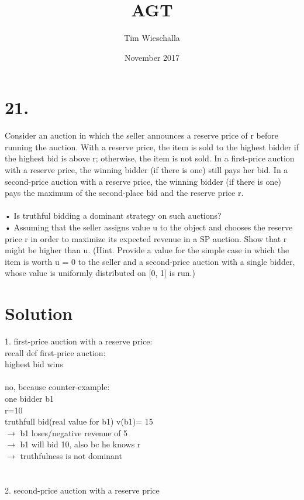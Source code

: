 \documentclass{article}
\title{AGT}
\author{Tim Wieschalla}
\date{November 2017}
\begin{document}
\maketitle

\section{21.}

 Consider an auction in which the seller announces a reserve price of r before running the auction. With a reserve price, the item is sold to the highest bidder if the highest bid is above r; otherwise, the item is not sold. In a first-price auction with a reserve price, the winning bidder (if there is one) still pays her bid. In a second-price auction with a reserve price, the winning bidder (if there is one) pays the maximum of the second-place bid and the reserve price r.
\\
\\
• Is truthful bidding a dominant strategy on such auctions?\\
• Assuming that the seller assigns value u to the object and chooses the reserve price r in order to maximize its expected revenue in a SP auction. Show that r might be higher than u. (Hint. Provide a value for the simple case in which the item is worth u = 0 to the seller and a second-price auction with a single bidder, whose value is uniformly distributed on [0, 1] is run.)




\section{Solution}
1. first-price auction with a reserve price:\\
recall def first-price auction: \\
highest bid wins
\\\\
no, because counter-example:\\
one bidder b1\\
r=10 \\
truthfull bid(real value for b1) v(b1)= 15\\
$\rightarrow$ b1 loses/negative revenue of 5\\
$\rightarrow$ b1 will bid 10, also bc he knows r\\
$\rightarrow$ truthfulness is not dominant\\
\\\\
2. second-price auction with a reserve price
\end{document}

